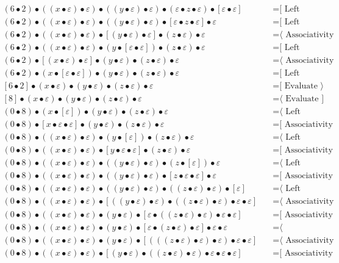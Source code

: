 \documentclass{article}
\begin{document}
\begin{align*}
(6 • 2) • ((x • ε) • ε) • ((y • ε) • ε) • (ε • z • ε) • [ε • ε]
  & \quad \text{=[ Left neutrality ⟩}\\
(6 • 2) • ((x • ε) • ε) • ((y • ε) • ε) • [ε • z • ε] • ε
  & \quad \text{=[ Left neutrality ⟩}\\
(6 • 2) • ((x • ε) • ε) • [(y • ε) • ε] • (z • ε) • ε
  & \quad \text{=⟨ Associativity ]}\\
(6 • 2) • ((x • ε) • ε) • (y • [ε • ε]) • (z • ε) • ε
  & \quad \text{=[ Left neutrality ⟩}\\
(6 • 2) • [(x • ε) • ε] • (y • ε) • (z • ε) • ε
  & \quad \text{=⟨ Associativity ]}\\
(6 • 2) • (x • [ε • ε]) • (y • ε) • (z • ε) • ε
  & \quad \text{=[ Left neutrality ⟩}\\
[6 • 2] • (x • ε) • (y • ε) • (z • ε) • ε
  & \quad \text{=[ Evaluate ⟩}\\
[8] • (x • ε) • (y • ε) • (z • ε) • ε
  & \quad \text{=⟨ Evaluate ]}\\
(0 • 8) • (x • [ε]) • (y • ε) • (z • ε) • ε
  & \quad \text{=⟨ Left neutrality ]}\\
(0 • 8) • [x • ε • ε] • (y • ε) • (z • ε) • ε
  & \quad \text{=[ Associativity ⟩}\\
(0 • 8) • ((x • ε) • ε) • (y • [ε]) • (z • ε) • ε
  & \quad \text{=⟨ Left neutrality ]}\\
(0 • 8) • ((x • ε) • ε) • [y • ε • ε] • (z • ε) • ε
  & \quad \text{=[ Associativity ⟩}\\
(0 • 8) • ((x • ε) • ε) • ((y • ε) • ε) • (z • [ε]) • ε
  & \quad \text{=⟨ Left neutrality ]}\\
(0 • 8) • ((x • ε) • ε) • ((y • ε) • ε) • [z • ε • ε] • ε
  & \quad \text{=[ Associativity ⟩}\\
(0 • 8) • ((x • ε) • ε) • ((y • ε) • ε) • ((z • ε) • ε) • [ε]
  & \quad \text{=⟨ Left neutrality ]}\\
(0 • 8) • ((x • ε) • ε) • [((y • ε) • ε) • ((z • ε) • ε) • ε • ε]
  & \quad \text{=⟨ Associativity ]}\\
(0 • 8) • ((x • ε) • ε) • (y • ε) • [ε • ((z • ε) • ε) • ε • ε]
  & \quad \text{=[ Associativity ⟩}\\
(0 • 8) • ((x • ε) • ε) • (y • ε) • [ε • (z • ε) • ε] • ε • ε
  & \quad \text{=⟨ Commutativity ]}\\
(0 • 8) • ((x • ε) • ε) • (y • ε) • [(((z • ε) • ε) • ε) • ε • ε]
  & \quad \text{=⟨ Associativity ]}\\
(0 • 8) • ((x • ε) • ε) • [(y • ε) • ((z • ε) • ε) • ε • ε • ε]
  & \quad \text{=[ Associativity ⟩}\\

\end{align*}
\end{document}
